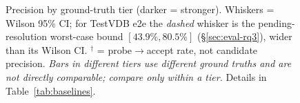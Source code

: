 \documentclass[sigconf]{acmart}
\begin{document}
\begin{figure}[t]
\caption{Precision by ground-truth tier (darker = stronger). Whiskers = Wilson 95\% CI; for TestVDB e2e the \emph{dashed} whisker is the pending-resolution worst-case bound $[43.9\%, 80.5\%]$ (\S\ref{sec:eval-rq3}), wider than its Wilson CI. $^\dagger$ = probe$\to$accept rate, not candidate precision. \emph{Bars in different tiers use different ground truths and are not directly comparable; compare only within a tier.} Details in Table~\ref{tab:baselines}.}
\label{fig:precision}
\end{figure}
\end{document}
